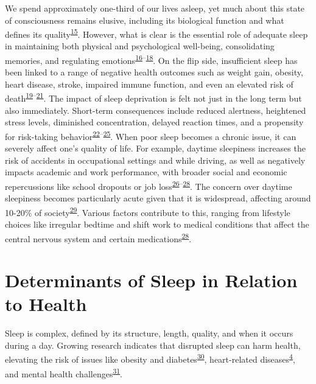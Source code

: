 \documentclass[
  10pt,
]{scrbook}
\begin{document}
We spend approximately one-third of our lives asleep, yet much about
this state of consciousness remains elusive, including its biological
function and what defines its
quality\textsuperscript{\protect\hyperlink{ref-ma_sleep_2017}{15}}.
However, what is clear is the essential role of adequate sleep in
maintaining both physical and psychological well-being, consolidating
memories, and regulating
emotions\textsuperscript{\protect\hyperlink{ref-worley_2018}{16}--\protect\hyperlink{ref-scott_2021}{18}}.
On the flip side, insufficient sleep has been linked to a range of
negative health outcomes such as weight gain, obesity, heart disease,
stroke, impaired immune function, and even an elevated risk of
death\textsuperscript{\protect\hyperlink{ref-consensus_conference_panel_recommended_2015}{19}--\protect\hyperlink{ref-hale_2020}{21}}.
The impact of sleep deprivation is felt not just in the long term but
also immediately. Short-term consequences include reduced alertness,
heightened stress levels, diminished concentration, delayed reaction
times, and a propensity for risk-taking
behavior\textsuperscript{\protect\hyperlink{ref-shochat_2014}{22}--\protect\hyperlink{ref-bonnet_1985}{25}}.
When poor sleep becomes a chronic issue, it can severely affect one's
quality of life. For example, daytime sleepiness increases the risk of
accidents in occupational settings and while driving, as well as
negatively impacts academic and work performance, with broader social
and economic repercussions like school dropouts or job
loss\textsuperscript{\protect\hyperlink{ref-connor_2002}{26}--\protect\hyperlink{ref-roth_1996}{28}}.
The concern over daytime sleepiness becomes particularly acute given
that it is widespread, affecting around 10-20\% of
society\textsuperscript{\protect\hyperlink{ref-wang_2019}{29}}. Various
factors contribute to this, ranging from lifestyle choices like
irregular bedtime and shift work to medical conditions that affect the
central nervous system and certain
medications\textsuperscript{\protect\hyperlink{ref-roth_1996}{28}}.

\hypertarget{determinants-of-sleep-in-relation-to-health}{%
\section{Determinants of Sleep in Relation to
Health}\label{determinants-of-sleep-in-relation-to-health}}

Sleep is complex, defined by its structure, length, quality, and when it
occurs during a day. Growing research indicates that disrupted sleep can
harm health, elevating the risk of issues like obesity and
diabetes\textsuperscript{\protect\hyperlink{ref-reutrakul_2018}{30}},
heart-related
diseases\textsuperscript{\protect\hyperlink{ref-cappuccio_sleep_2010}{4}},
and mental health
challenges\textsuperscript{\protect\hyperlink{ref-jouxe3o_2018}{31}}.
\end{document}
